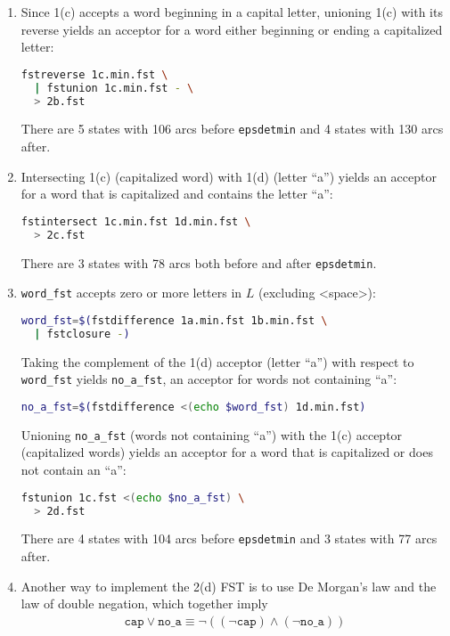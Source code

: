 \documentclass[a4paper,oneside,reqno]{amsart}
\begin{document}
\begin{enumerate}[label=\arabic*.]
\begin{enumerate}[label=(\alph*)]
      \item Since 1(c) accepts a word beginning in a capital letter, unioning
        1(c) with its reverse yields an acceptor for a word either beginning or
        ending a capitalized letter:
        \begin{lstlisting}[language=bash]
fstreverse 1c.min.fst \
  | fstunion 1c.min.fst - \
  > 2b.fst
        \end{lstlisting}
        There are 5 states with 106 arcs before \texttt{epsdetmin} and 4
        states with 130 arcs after.

      \item Intersecting 1(c) (capitalized word) with 1(d) (letter ``a'') yields
        an acceptor for a word that is capitalized and contains the letter ``a'':
        \begin{lstlisting}[language=bash]
fstintersect 1c.min.fst 1d.min.fst \
  > 2c.fst
        \end{lstlisting}
        There are 3 states with 78 arcs both before and after \texttt{epsdetmin}.

      \item \texttt{word\_fst} accepts zero or more letters in $L$ (excluding
        <space>):
        \begin{lstlisting}[language=bash]
word_fst=$(fstdifference 1a.min.fst 1b.min.fst \
  | fstclosure -)
        \end{lstlisting}

        Taking the complement of the 1(d) acceptor (letter ``a'') with respect to
        \texttt{word\_fst} yields \texttt{no\_a\_fst}, an acceptor for words
        not containing ``a'':
        \begin{lstlisting}[language=bash]
no_a_fst=$(fstdifference <(echo $word_fst) 1d.min.fst)
        \end{lstlisting}

        Unioning \texttt{no\_a\_fst} (words not containing ``a'') with
        the 1(c) acceptor (capitalized words) yields an acceptor for
        a word that is capitalized or does not contain an ``a'':
        \begin{lstlisting}[language=bash]
fstunion 1c.fst <(echo $no_a_fst) \
  > 2d.fst
        \end{lstlisting}
        There are 4 states with 104 arcs before \texttt{epsdetmin} and 3
        states with 77 arcs after.

      \item Another way to implement the 2(d) FST is to use De Morgan's law and
        the law of double negation, which together imply
        \begin{align}
          \texttt{cap} \lor \texttt{no\_a} \equiv
          \lnot ((\lnot \texttt{cap}) \land (\lnot \texttt{no\_a}))
        \end{align}


\end{enumerate}
\end{enumerate}
\end{document}

